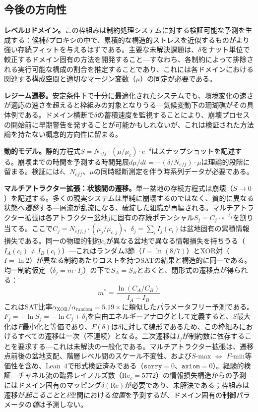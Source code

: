 \documentclass[11pt,a4paper]{article}
\begin{document}
\subsection{今後の方向性}

\textbf{レベルBドメイン。}この枠組みは制約処理システムに対する検証可能な予測を生成する：候補$\delta$プロキシの中で、累積的な構造的ストレスを近似するものがより強い存続フィットを与えるはずである。主要な未解決課題は、$\delta$をナット単位で較正するドメイン固有の方法を開発すること---すなわち、各制約によって排除される実行可能な構成の割合を推定することであり、これには各ドメインにおける関連する構成空間と適切なマージン変数（$\mu$）の同定が必要である。

\textbf{レジーム遷移。}安定条件下で十分に最適化されたシステムでも、環境変化の速さが適応の速さを超えると枠組みの対象となりうる---気候変動下の珊瑚礁がその具体例である。ドメイン横断で$\delta$の蓄積速度を監視することにより、崩壊プロセスの開始前に早期警告を発することが可能かもしれないが、これは検証された方法論を持たない概念的方向性に留まる。

\textbf{動的モデル。}静的方程式$S = N_{eff} \cdot (\mu/\mu_c) \cdot e^{-\delta}$はスナップショットを記述する。崩壊までの時間を予測する時間発展$d\mu/dt = -(\delta/N_{eff}) \cdot \mu$は理論的段階に留まる。検証には$\delta$、$N_{eff}$、$\mu$の同時縦断測定を伴う時系列データが必要である。

\textbf{マルチアトラクター拡張：状態間の遷移。}単一盆地の存続方程式は崩壊（$S \to 0$）を記述する。多くの現実システムは単純に崩壊するのではなく、質的に異なる状態へ\emph{遷移}する---層流が乱流になる、破綻した組織が再編される。マルチアトラクター拡張は各アトラクター盆地$j$に固有の存続ポテンシャル$S_j = C_j \cdot e^{-\delta_j}$を割り当てる。ここで$C_j = N_{eff,j} \cdot (\mu_j/\mu_{c,j})$、$\delta_j = \sum_i I_j(c_i)$は盆地固有の累積情報損失である。同一の物理的制約$c_i$が異なる盆地で異なる情報損失を持ちうる（$I_A(c_i) \neq I_B(c_i)$）---これはランダム3節（$I = \ln(8/7)$）とXOR対（$I = \ln 2$）が異なる制約あたりコストを持つSATの結果と構造的に同一である。均一制約仮定（$\delta_j = m \cdot I_j$）の下で$S_A = S_B$とおくと、閉形式の遷移点が得られる：
\[
m^* = \frac{\ln(C_A / C_B)}{I_A - I_B}
\]
これはSAT比率$\alpha_{\text{XOR}}/\alpha_{\text{random}} = 5.19\times$に類似したパラメータフリー予測である。$F_j = -\ln S_j = -\ln C_j + \delta_j$を自由エネルギーアナログとして定義すると、$S$最大化は$F$最小化と等価であり、$F(\delta)$は$\delta$に対して線形であるため、この枠組みにおけるすべての遷移は一次（不連続）となる。二次遷移は$I_j$が制約数に依存することを要求する---これは未解決の一般化である。マルチアトラクター拡張は、遷移点前後の盆地支配、階層レベル間のスケール不変性、および$S$-max $\Leftrightarrow$ $F$-min等価性を含め、Lean~4で形式検証済みである（$\texttt{sorry} = 0$、$\texttt{axiom} = 0$）。経験的検証---チャネル流の臨界レイノルズ数（$\text{Re}_c = 5772$）の情報損失構造からの予測---にはドメイン固有のマッピング$\delta(\text{Re})$が必要であり、未解決である；枠組みは遷移が\emph{起こること}と$\delta$空間における\emph{位置}を予測するが、ドメイン固有の制御パラメータの\emph{値}は予測しない。
\end{document}
